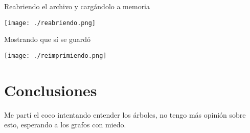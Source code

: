 \documentclass[11pt]{article}
\begin{document}
Reabriendo el archivo y cargándolo a memoria
\begin{center}
\texttt{[image: ./reabriendo.png]}
\end{center}

Mostrando que sí se guardó
\begin{center}
\texttt{[image: ./reimprimiendo.png]}
\end{center}

\section{Conclusiones}
\label{sec:org314505b}
Me partí el coco intentando entender los árboles,
no tengo más opinión sobre esto, esperando a los
grafos con miedo.
\end{document}
